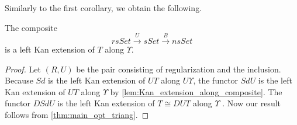 Similarly to the first corollary, we obtain the following.
\begin{corollary}\label{cor:left_Kan_extension_barycentric_along_Yoneda}
The composite
\[rsSet\xrightarrow{U} sSet\xrightarrow{B} nsSet\]
is a left Kan extension of $T$ along $\Upsilon$.
\end{corollary}
\begin{proof}
Let $(R,U)$ be the pair consisting of regularization and the inclusion. Because $Sd$ is the left Kan extension of $UT$ along $U\Upsilon$, the functor $SdU$ is the left Kan extension of $UT$ along $\Upsilon$ by \cref{lem:Kan_extension_along_composite}. The functor $DSdU$ is the left Kan extension of $T\cong DUT$ \cite[§IV.3~Thm.~1]{ML98} along $\Upsilon$ \cite[§X.5~Thm.~1]{ML98}. Now our result follows from \cref{thm:main_opt_triang}.
\end{proof}




